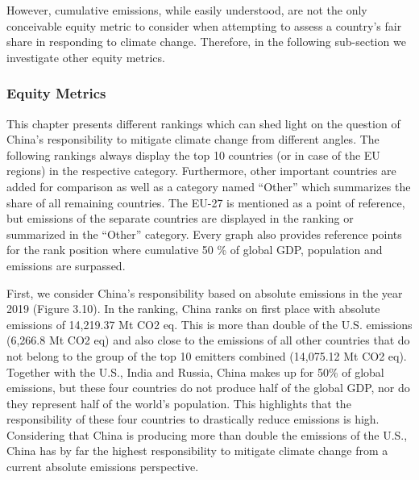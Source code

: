 \documentclass[
  12pt,
]{article}
\numberwithin{equation}{section}
\numberwithin{table}{section}
\numberwithin{figure}{section}
\begin{document}
However, cumulative emissions, while easily understood, are not the only
conceivable equity metric to consider when attempting to assess a
country's fair share in responding to climate change. Therefore, in the
following sub-section we investigate other equity metrics.

\hypertarget{equity-metrics}{%
\subsubsection{Equity Metrics}\label{equity-metrics}}

This chapter presents different rankings which can shed light on the
question of China's responsibility to mitigate climate change from
different angles. The following rankings always display the top 10
countries (or in case of the EU regions) in the respective category.
Furthermore, other important countries are added for comparison as well
as a category named ``Other'' which summarizes the share of all
remaining countries. The EU-27 is mentioned as a point of reference, but
emissions of the separate countries are displayed in the ranking or
summarized in the ``Other'' category. Every graph also provides
reference points for the rank position where cumulative 50 \% of global
GDP, population and emissions are surpassed.

First, we consider China's responsibility based on absolute emissions in
the year 2019 (Figure 3.10). In the ranking, China ranks on first place
with absolute emissions of 14,219.37 Mt CO2 eq. This is more than double
of the U.S. emissions (6,266.8 Mt CO2 eq) and also close to the
emissions of all other countries that do not belong to the group of the
top 10 emitters combined (14,075.12 Mt CO2 eq). Together with the U.S.,
India and Russia, China makes up for 50\% of global emissions, but these
four countries do not produce half of the global GDP, nor do they
represent half of the world's population. This highlights that the
responsibility of these four countries to drastically reduce emissions
is high. Considering that China is producing more than double the
emissions of the U.S., China has by far the highest responsibility to
mitigate climate change from a current absolute emissions perspective.
\end{document}
